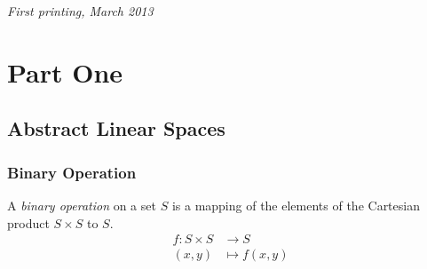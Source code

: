 \documentclass[11pt,fleqn]{book} %
\begin{document}
\noindent \textit{First printing, March 2013} %




\pagestyle{empty} %

\tableofcontents %

\cleardoublepage %

\pagestyle{fancy} %


\part{Part One}



\chapter{Abstract Linear Spaces}

\section{Binary Operation}

\begin{definition}
    A \emph{binary operation} on a set $S$ is a mapping of the elements of the Cartesian product $S \times S$ to $S$.
    \[ \begin{split}
            f : S \times S & \to S \\ (x,y) &\mapsto f(x,y)
        \end{split}\]
\end{definition}
\end{document}
